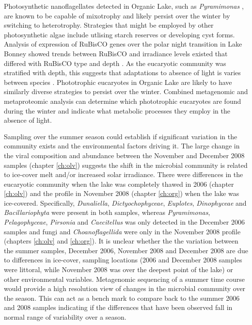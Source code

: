 Photosynthetic nanoflagellates detected in Organic Lake, such as \emph{Pyramimonas} \cite{Bell2003}, are known to be capable of mixotrophy and likely persist over the winter by switching to heterotrophy.
Strategies that might be employed by other photosynthetic algae include utlising starch reserves or developing cyst forms.
Analysis of expression of \acs{RuBisCO} genes over the polar night transition in Lake Bonney showed trends between \acs{RuBisCO} and irradiance levels existed that differed with \acs{RuBisCO} type and depth \cite{Kong2012a}.
As the eucaryotic community was stratified with depth, this suggests that adaptations to absence of light is varies between species \cite{Kong2012a}.
Phototrophic eucaryotes in Organic Lake are likely to have similarly diverse strategies to persist over the winter.
Combined metagenomic and metaproteomic analysis can determine which phototrophic eucaryotes are found during the winter and indicate what metabolic processes they employ in the absence of light.

Sampling over the summer season could establish if significant variation in the community exists and the environmental factors driving it.
The large change in the viral composition and abundance between the November and December 2008 samples (chapter \ref{ch:olv}) suggests the shift in the microbial community is related to ice-cover melt and/or increased solar irradiance. 
There were differences in the eucaryotic community when the lake was completely thawed in 2006 (chapter \ref{ch:olv}) and the profile in November 2008 (chapter \ref{ch:org}) when the lake was ice-covered.
Specifically, \emph{Dunaliella}, \emph{Dictyochophyceae}, \emph{Euplotes}, \emph{Dinophyceae} and \emph{Bacillariophyta} were present in both samples, whereas \emph{Pyramimonas}, \emph{Pelagophyceae}, \emph{Pirsonia} and \emph{Caecitellus} was only detected in the December 2006 samples and fungi and \emph{Choanoflagellida} were only in the November 2008 profile (chapters \ref{ch:olv} and \ref{ch:org}).
It is unclear whether the the variation between the summer samples, December 2006, November 2008 and December 2008 are due to differences in ice-cover, sampling locations  (2006 and December 2008 samples were littoral, while November 2008 was over the deepest point of the lake) or other environmental variables.
Metagenomic sequencing of a summer time course would provide a high resolution view of changes in the microbial community over the season.
This can act as a bench mark to compare back to the summer 2006 and 2008 samples indicating if the differences that have been observed fall in normal range of variability over a season.

